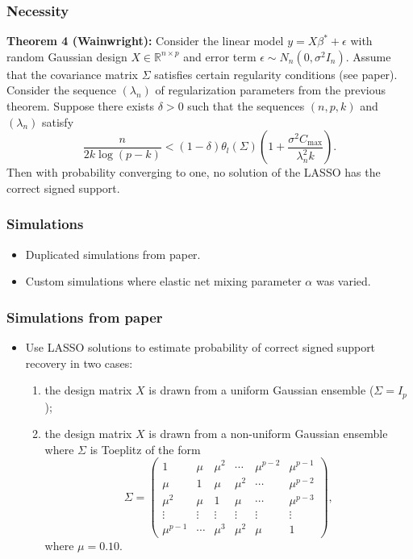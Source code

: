 \documentclass{beamer}
\begin{document}
\begin{frame}
\frametitle{Necessity}

\textbf{Theorem 4 (Wainwright):}
Consider the linear model $y = X\beta^\ast + \epsilon$ with random
Gaussian design $X \in \mathbb{R}^{n \times p}$ and error term
$\epsilon \sim N_n(0, \sigma^2 I_n)$. Assume that the covariance
matrix $\Sigma$ satisfies certain regularity conditions (see
paper). Consider the sequence $(\lambda_n)$ of regularization
parameters from the previous theorem. Suppose there exists
$\delta > 0$ such that the sequences $(n, p, k)$ and $(\lambda_n)$
satisfy
\begin{equation*}
  \frac{n}{2k \log (p - k)}
  < (1 - \delta) \theta_l(\Sigma)
  \left ( 1 + \frac{\sigma^2 C_{\mathrm{max}}}{\lambda_n^2 k}
  \right ).
\end{equation*}
Then with probability converging to one, no solution of the LASSO
has the correct signed support.

\end{frame}

\begin{frame}
\frametitle{Simulations}

\begin{itemize}
\item Duplicated simulations from paper.
\item Custom simulations where elastic net mixing parameter $\alpha$
  was varied.
\end{itemize}

\end{frame}

\begin{frame}
\frametitle{Simulations from paper}

\begin{itemize}
\item Use LASSO solutions to estimate probability of correct signed
  support recovery in two cases:
\begin{enumerate}
\item the design matrix $X$ is drawn from a uniform Gaussian ensemble
  ($\Sigma = I_p$);
\item the design matrix $X$ is drawn from a non-uniform Gaussian
  ensemble where $\Sigma$ is Toeplitz of the form
  \begin{equation*}
    \Sigma =
    \begin{pmatrix}
      1 & \mu & \mu^2 & \cdots & \mu^{p-2} & \mu^{p-1} \\
      \mu & 1 & \mu & \mu^2 & \cdots & \mu^{p-2} \\
      \mu^2 & \mu & 1 & \mu & \cdots & \mu^{p-3} \\
      \vdots & \vdots & \vdots & \vdots & \vdots & \vdots \\
      \mu^{p-1} & \cdots & \mu^3 & \mu^2 & \mu & 1
    \end{pmatrix},
  \end{equation*}
  where $\mu = 0.10$.
\end{enumerate}
\end{itemize}

\end{frame}
\end{document}
